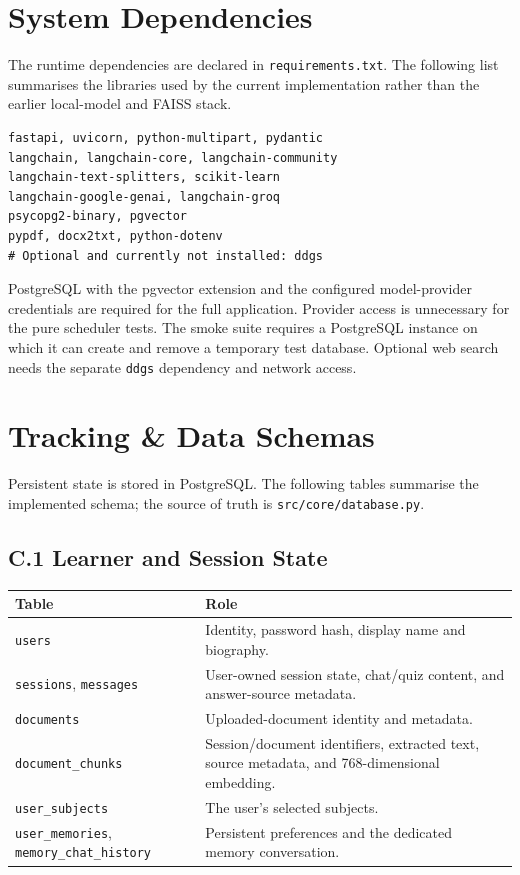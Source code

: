 \documentclass[11pt, a4paper, oneside]{report}
\begin{document}
\chapter{System Dependencies}
The runtime dependencies are declared in \texttt{requirements.txt}. The following list summarises the libraries used by the current implementation rather than the earlier local-model and FAISS stack.
\begin{lstlisting}
fastapi, uvicorn, python-multipart, pydantic
langchain, langchain-core, langchain-community
langchain-text-splitters, scikit-learn
langchain-google-genai, langchain-groq
psycopg2-binary, pgvector
pypdf, docx2txt, python-dotenv
# Optional and currently not installed: ddgs
\end{lstlisting}
PostgreSQL with the pgvector extension and the configured model-provider credentials are required for the full application. Provider access is unnecessary for the pure scheduler tests. The smoke suite requires a PostgreSQL instance on which it can create and remove a temporary test database. Optional web search needs the separate \texttt{ddgs} dependency and network access.

\chapter{Tracking \& Data Schemas}
Persistent state is stored in PostgreSQL. The following tables summarise the implemented schema; the source of truth is \texttt{src/core/database.py}.

\section*{C.1 Learner and Session State}
\begin{longtable}{@{}p{4cm} p{8.4cm}@{}}
\toprule
\textbf{Table} & \textbf{Role} \\
\midrule
\endhead
\texttt{users} & Identity, password hash, display name and biography. \\
\texttt{sessions}, \texttt{messages} & User-owned session state, chat/quiz content, and answer-source metadata. \\
\texttt{documents} & Uploaded-document identity and metadata. \\
\texttt{document\_chunks} & Session/document identifiers, extracted text, source metadata, and 768-dimensional embedding. \\
\texttt{user\_subjects} & The user's selected subjects. \\
\texttt{user\_memories}, \texttt{memory\_chat\_history} & Persistent preferences and the dedicated memory conversation. \\
\bottomrule
\end{longtable}
\end{document}
